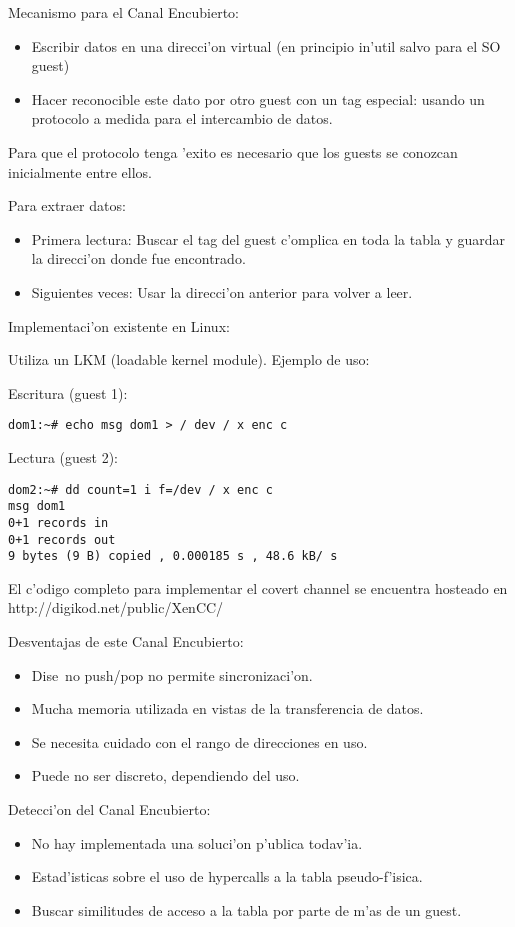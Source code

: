 Mecanismo para el Canal Encubierto:
\begin{itemize}
	\item Escribir datos en una direcci'on virtual (en principio in'util salvo para el SO guest)
	\item Hacer reconocible este dato por otro guest con un tag especial: usando un protocolo a medida para el intercambio de datos. 
\end{itemize}

Para que el protocolo tenga 'exito es necesario que los guests se conozcan inicialmente entre ellos.

Para extraer datos:
\begin{itemize}
	\item Primera lectura: Buscar el tag del guest c'omplica en toda la tabla y guardar la direcci'on donde fue encontrado.
	\item Siguientes veces: Usar la direcci'on anterior para volver a leer.
\end{itemize}

Implementaci'on existente en Linux:

Utiliza un LKM (loadable kernel module). Ejemplo de uso:

Escritura (guest 1):
\begin{verbatim}
dom1:~# echo msg dom1 > / dev / x enc c
\end{verbatim}

Lectura (guest 2):
\begin{verbatim}
dom2:~# dd count=1 i f=/dev / x enc c
msg dom1
0+1 records in
0+1 records out
9 bytes (9 B) copied , 0.000185 s , 48.6 kB/ s
\end{verbatim}

El c'odigo completo para implementar el covert channel se encuentra hosteado en http://digikod.net/public/XenCC/

Desventajas de este Canal Encubierto:
\begin{itemize}
	\item Dise~no push/pop no permite sincronizaci'on.
	\item Mucha memoria utilizada en vistas de la transferencia de datos.
	\item Se necesita cuidado con el rango de direcciones en uso.
	\item Puede no ser discreto, dependiendo del uso.
\end{itemize}

Detecci'on del Canal Encubierto:
\begin{itemize}
	\item No hay implementada una soluci'on p'ublica todav'ia.
	\item Estad'isticas sobre el uso de hypercalls a la tabla pseudo-f'isica.
	\item Buscar similitudes de acceso a la tabla por parte de m'as de un guest.
\end{itemize}